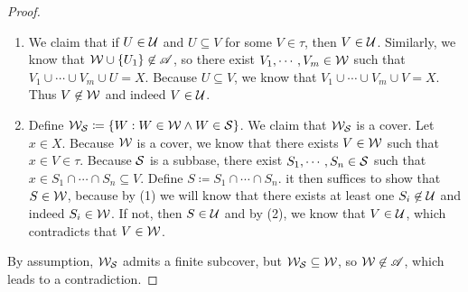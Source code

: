 \documentclass[screen]{techreport}
\numberwithin{equation}{section}
\begin{document}
\begin{proof}
\begin{enumerate}
		\item We claim that if $U \in \mathcal{U}$ and $U \subseteq V$ for some $V \in \tau$, then $V \in \mathcal{U}$.
		Similarly, we know that $\mathcal{W} \cup \{ U_1\} \not\in \mathscr{A}$, so there exist $V_1,\cdots,V_m \in \mathcal{W}$ such that $V_1\cup \cdots \cup V_m \cup U = X$.
		Because $U \subseteq V$, we know that $V_1 \cup \cdots \cup V_m \cup V = X$.
		Thus $V \not\in \mathcal{W}$ and indeed $V \in \mathcal{U}$.
		
		\item Define $\mathcal{W}_{\mathcal{S}} \coloneqq \{ W : W \in \mathcal{W} \wedge W \in \mathcal{S} \}$.
		We claim that $\mathcal{W}_{\mathcal{S}}$ is a cover.
		Let $x \in X$.
		Because $\mathcal{W}$ is a cover, we know that there exists $V \in \mathcal{W}$ such that $x \in V \in \tau$.
		Because $\mathcal{S}$ is a subbase, there exist $S_1,\cdots,S_n \in \mathcal{S}$ such that $x \in S_1 \cap \cdots \cap S_n \subseteq V$.
		Define $S \coloneqq S_1 \cap \cdots \cap S_n$.
		it then suffices to show that $S \in \mathcal{W}$, because by (1) we will know that there exists at least one $S_i \not\in \mathcal{U}$ and indeed $S_i \in \mathcal{W}$.
		If not, then $S \in \mathcal{U}$ and by (2), we know that $V \in \mathcal{U}$, which contradicts that $V \in \mathcal{W}$.
	\end{enumerate}
	By assumption, $\mathcal{W}_{\mathcal{S}}$ admits a finite subcover, but $\mathcal{W}_{\mathcal{S}} \subseteq \mathcal{W}$, so $\mathcal{W} \not\in \mathscr{A}$, which leads to a contradiction.
\end{proof}
\end{document}
